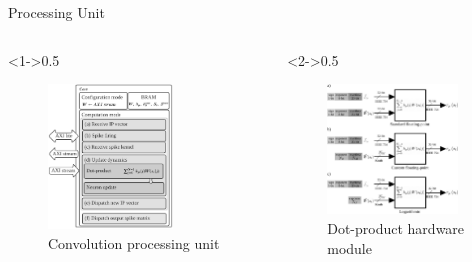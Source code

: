 \begin{frame}{Processing Unit}
	\begin{columns}[c] %
		
		\begin{column}<1->{0.5\textwidth}
			\begin{figure}
				\includegraphics[width=0.7\textwidth]{../chapters/sbs_accelerator/figures/sbs_conv.pdf} %
				\caption{Convolution processing unit}
			\end{figure}
		\end{column}
		
		\begin{column}<2->{0.5\textwidth}
			\begin{figure}
				\includegraphics[width=0.9\textwidth]{../chapters/sbs_accelerator/figures/dot-product_unit.pdf} %
				\caption{Dot-product hardware module}
			\end{figure}
		\end{column}
		

\end{columns}
\end{frame}
